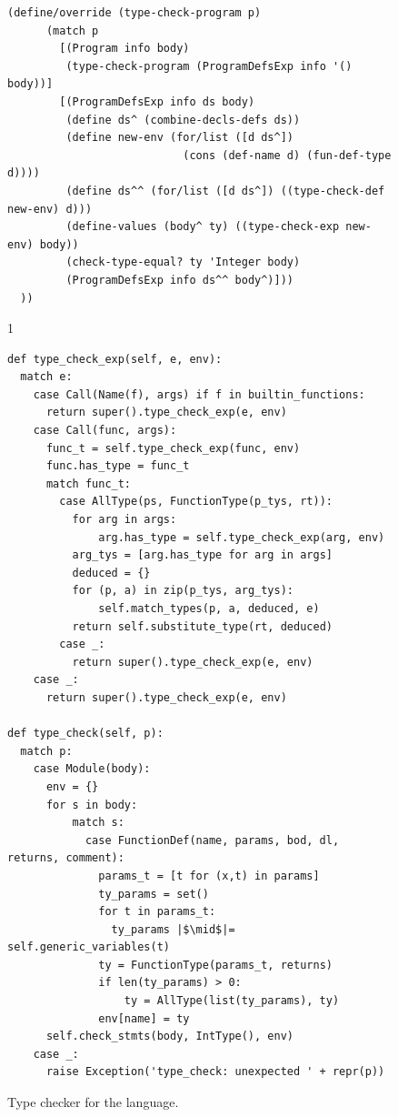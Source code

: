 \documentclass[7x10]{TimesAPriori_MIT}%
\def\pythonEd{1}
\def\edition{0}
\numberwithin{theorem}{chapter}
\numberwithin{definition}{chapter}
\numberwithin{equation}{chapter}
\begin{document}
\begin{figure}[tbp]
\begin{tcolorbox}[colback=white]
\begin{lstlisting}[basicstyle=\ttfamily\scriptsize]
    (define/override (type-check-program p)
      (match p
        [(Program info body)
         (type-check-program (ProgramDefsExp info '() body))]
        [(ProgramDefsExp info ds body)
         (define ds^ (combine-decls-defs ds))
         (define new-env (for/list ([d ds^])
                           (cons (def-name d) (fun-def-type d))))
         (define ds^^ (for/list ([d ds^]) ((type-check-def new-env) d)))
         (define-values (body^ ty) ((type-check-exp new-env) body))
         (check-type-equal? ty 'Integer body)
         (ProgramDefsExp info ds^^ body^)]))
  ))
\end{lstlisting}
\fi
\if\edition\pythonEd
\begin{lstlisting}[basicstyle=\ttfamily\small]
def type_check_exp(self, e, env):
  match e:
    case Call(Name(f), args) if f in builtin_functions:
      return super().type_check_exp(e, env)      
    case Call(func, args):
      func_t = self.type_check_exp(func, env)
      func.has_type = func_t
      match func_t:
        case AllType(ps, FunctionType(p_tys, rt)):
          for arg in args:
              arg.has_type = self.type_check_exp(arg, env)
          arg_tys = [arg.has_type for arg in args]
          deduced = {}
          for (p, a) in zip(p_tys, arg_tys):
              self.match_types(p, a, deduced, e)
          return self.substitute_type(rt, deduced)
        case _:
          return super().type_check_exp(e, env)
    case _:
      return super().type_check_exp(e, env)

def type_check(self, p):
  match p:
    case Module(body):
      env = {}
      for s in body:
          match s:
            case FunctionDef(name, params, bod, dl, returns, comment):
              params_t = [t for (x,t) in params]
              ty_params = set()
              for t in params_t:
                ty_params |$\mid$|= self.generic_variables(t)
              ty = FunctionType(params_t, returns)
              if len(ty_params) > 0:
                  ty = AllType(list(ty_params), ty)
              env[name] = ty
      self.check_stmts(body, IntType(), env)
    case _:
      raise Exception('type_check: unexpected ' + repr(p))
\end{lstlisting}
\fi
\end{tcolorbox}

\caption{Type checker for the \LangPoly{} language.}
\label{fig:type-check-Lpoly}
\end{figure}
\end{document}
